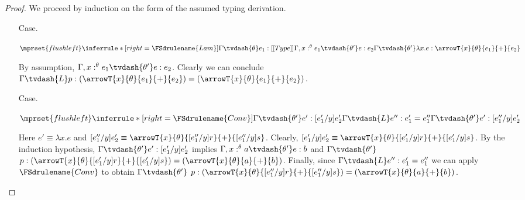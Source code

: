 \begin{proof}
  We proceed by induction on the form of the assumed typing derivation.
  \begin{itemize}
  \item[Case.]\ \\
    \begin{center}
      \begin{math}
        $$\mprset{flushleft}
        \inferrule* [right=\FSdrulename{Lam}] {
          \Gamma \tvdash{\theta} e_1:[[Type]]
          \\\\
          \Gamma,x:^{\theta} e_1 \tvdash{\theta'} e:e_2
        }{\Gamma \tvdash{\theta'} \lambda x.e:\arrowT{x}{\theta}{e_1}{+}{e_2}}
      \end{math}
    \end{center}
    By assumption, $\Gamma,x:^{\theta} e_1 \tvdash{\theta'} e:e_2$.  Clearly we can conclude
    $\Gamma \tvdash{L} p:(\arrowT{x}{\theta}{e_1}{+}{e_2}) = (\arrowT{x}{\theta}{e_1}{+}{e_2})$.
    
  \item[Case.]\ \\
    \begin{center}
      \begin{math}
        $$\mprset{flushleft}
        \inferrule* [right=\FSdrulename{Conv}] {
          \Gamma \tvdash{\theta'} e':[e'_1/y]e'_2
          \\\\
          \Gamma \tvdash{L} e'':e'_1 = e''_1
        }{\Gamma \tvdash{\theta'} e':[e''_1/y]e'_2}
      \end{math}
    \end{center}
    Here $e' \equiv \lambda x.e$ and 
    $[e''_1/y]e'_2 \equiv \arrowT{x}{\theta}{[e''_1/y]r}{+}{[e''_1/y]s}$.  Clearly,
    $[e'_1/y]e'_2 \equiv \arrowT{x}{\theta}{[e'_1/y]r}{+}{[e'_1/y]s}$.  By the induction
    hypothesis, $\Gamma \tvdash{\theta'} e':[e'_1/y]e'_2$ implies 
    $\Gamma,x:^\theta a \tvdash{\theta'} e:b$ and 
    $\Gamma \tvdash{\theta'} $
    $p:(\arrowT{x}{\theta}{[e'_1/y]r}{+}{[e'_1/y]s}) = (\arrowT{x}{\theta}{a}{+}{b})$.  Finally, 
    since $\Gamma \tvdash{L} e'':e'_1 = e''_1$ we can apply $\FSdrulename{Conv}$ to obtain
    $\Gamma \tvdash{\theta'} $
    $p:(\arrowT{x}{\theta}{[e''_1/y]r}{+}{[e''_1/y]s}) = (\arrowT{x}{\theta}{a}{+}{b})$.
  \end{itemize}
\end{proof}

